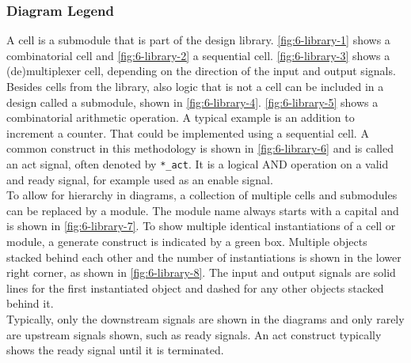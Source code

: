 \subsubsection{Diagram Legend}
\label{sec:legend}
A cell is a submodule that is part of the design library. \autoref{fig:6-library-1} shows a combinatorial cell and \autoref{fig:6-library-2} a sequential cell. \autoref{fig:6-library-3} shows a (de)multiplexer cell, depending on the direction of the input and output signals.\\
Besides cells from the library, also logic that is not a cell can be included in a design called a submodule, shown in \autoref{fig:6-library-4}. \autoref{fig:6-library-5} shows a combinatorial arithmetic operation. A typical example is an addition to increment a counter. That could be implemented using a sequential cell. A common construct in this methodology is shown in \autoref{fig:6-library-6} and is called an act signal, often denoted by \texttt{*\_act}. It is a logical AND operation on a valid and ready signal, for example used as an enable signal.\\
To allow for hierarchy in diagrams, a collection of multiple cells and submodules can be replaced by a module. The module name always starts with a capital and is shown in \autoref{fig:6-library-7}. To show multiple identical instantiations of a cell or module, a generate construct is indicated by a green box. Multiple objects stacked behind each other and the number of instantiations is shown in the lower right corner, as shown in \autoref{fig:6-library-8}. The input and output signals are solid lines for the first instantiated object and dashed for any other objects stacked behind it.\\
Typically, only the downstream signals are shown in the diagrams and only rarely are upstream signals shown, such as ready signals. An act construct typically shows the ready signal until it is terminated.

